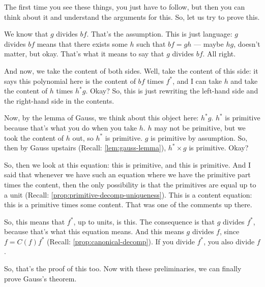 \begin{speech}[00:16:14 - 00:17:55]
The first time you see these things, you just have to follow, but then you can think about it and understand the arguments for this. So, let us try to prove this.

We know that $g$ divides $bf$. That's the assumption. This is just language: $g$ divides $bf$ means that there exists some $h$ such that $bf = gh$ --- maybe $hg$, doesn't matter, but okay.  That's what it means to say that $g$ divides $bf$. All right.

And now, we take the content of both sides. Well, take the content of this side: it says this polynomial here is the content of $bf$ times $f^*$, and I can take $h$ and take the content of $h$ times $h^* g$.  Okay? So, this is just rewriting the left-hand side and the right-hand side in the contents.

Now, by the lemma of Gauss, we think about this object here: $h^* g$. $h^*$ is primitive because that's what you do when you take $h$. $h$ may not be primitive, but we took the content of $h$ out, so $h^*$ is primitive. $g$ is primitive by assumption. So, then by Gauss upstairs (Recall: \cref{lem:gauss-lemma}), $h^* \times g$ is primitive.  Okay?
\end{speech}

\begin{speech}[00:17:55 - 00:19:24]
So, then we look at this equation: this is primitive, and this is primitive. And I said that whenever we have such an equation where we have the primitive part times the content, then the only possibility is that the primitives are equal up to a unit (Recall: \cref{prop:primitive-decomp-uniqueness}). This is a content equation: this is a primitive times some content. That was one of the comments up there.

So, this means that $f^*$, up to units, is this.  The consequence is that $g$ divides $f^*$, because that's what this equation means. And this means $g$ divides $f$, since $f = C(f) f^*$ (Recall: \cref{prop:canonical-decomp}).  If you divide $f^*$, you also divide $f$.

So, that's the proof of this too. Now with these preliminaries, we can finally prove Gauss's theorem.
\end{speech}

